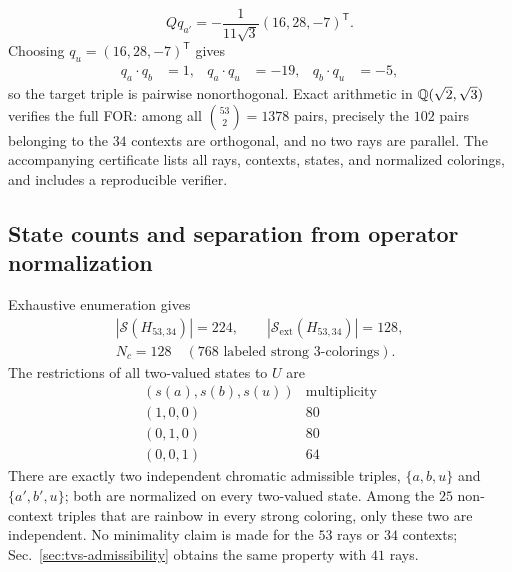 \documentclass[aps,pra,reprint,superscriptaddress,longbibliography,nofootinbib,floatfix,10pt]{revtex4-2}
\theoremstyle{definition}\newtheorem{definition}[theorem]{Definition}
\theoremstyle{remark}\newtheorem{remark}[theorem]{Remark}
\newcommand{\Sc}{\mathcal S}\newcommand{\Cc}{\mathcal C}\newcommand{\Wc}{\mathcal W}
\begin{document}
\begin{equation}\label{eq:H53-u-ray}
Qq_{a'}=-\frac1{11\sqrt3}(16,28,-7)^{\mathsf T}.
\end{equation}
Choosing $q_u=(16,28,-7)^{\mathsf T}$ gives
\begin{equation}\label{eq:H53-target-products}
\begin{aligned}
q_a\cdot q_b&=1,&q_a\cdot q_u&=-19,&q_b\cdot q_u&=-5,
\end{aligned}
\end{equation}
so the target triple is pairwise nonorthogonal. Exact arithmetic in $\mathbb Q(\sqrt2,\sqrt3)$ verifies the full FOR: among all $\binom{53}{2}=1378$ pairs, precisely the $102$ pairs belonging to the $34$ contexts are orthogonal, and no two rays are parallel. The accompanying certificate lists all rays, contexts, states, and normalized colorings, and includes a reproducible verifier.

\subsection{State counts and separation from operator normalization}


Exhaustive enumeration gives
\begin{equation}\label{eq:H53-counts}
\begin{gathered}
|\Sc(H_{53,34})|=224,\qquad|\Sc_{\mathrm{ext}}(H_{53,34})|=128,\\
N_c=128\quad(768\text{ labeled strong }3\text{-colorings}).
\end{gathered}
\end{equation}
The restrictions of all two-valued states to $U$ are
\begin{equation}\label{eq:H53-patterns}
\begin{array}{c|r}
(s(a),s(b),s(u))&\text{multiplicity}\\\hline
(1,0,0)&80\\
(0,1,0)&80\\
(0,0,1)&64
\end{array}
\end{equation}
There are exactly two independent chromatic admissible triples, $\{a,b,u\}$ and $\{a',b',u\}$; both are normalized on every two-valued state. Among the $25$ non-context triples that are rainbow in every strong coloring, only these two are independent. No minimality claim is made for the $53$ rays or $34$ contexts; Sec.~\ref{sec:tvs-admissibility} obtains the same property with $41$ rays.
\end{document}
